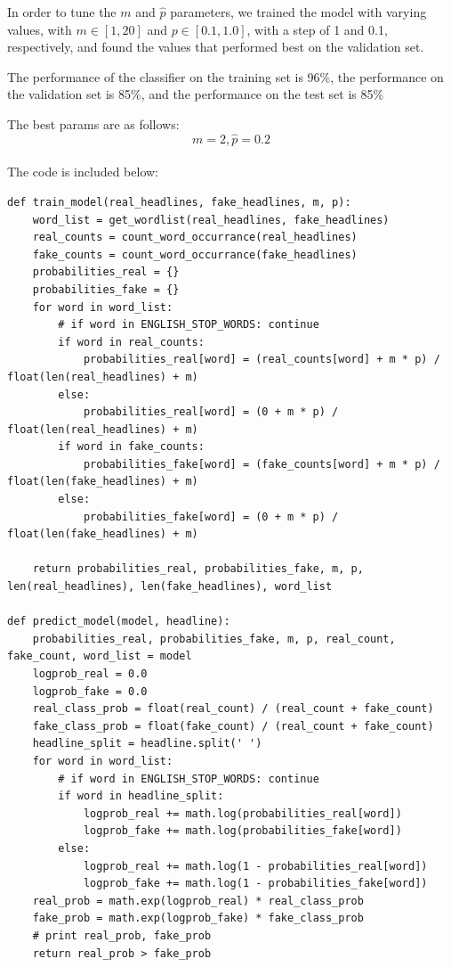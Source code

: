 \documentclass[10pt,letterpaper]{article}
\begin{document}
\begin{enumerate}
		In order to tune the $m$ and $\hat{p}$ parameters, we trained the model with varying values, with $m \in [1, 20]$ and $p\in [0.1, 1.0]$, with a step of 1 and 0.1, respectively, and found the values that performed best on the validation set.

		The performance of the classifier on the training set is 96\%, the performance on the validation set is 85\%, and the performance on the test set is 85\%

		The best params are as follows: \\
		\[m = 2, \hat{p} = 0.2\]
		\\
		The code is included below:
		\begin{lstlisting}
def train_model(real_headlines, fake_headlines, m, p):
    word_list = get_wordlist(real_headlines, fake_headlines)
    real_counts = count_word_occurrance(real_headlines)
    fake_counts = count_word_occurrance(fake_headlines)
    probabilities_real = {}
    probabilities_fake = {}
    for word in word_list:
        # if word in ENGLISH_STOP_WORDS: continue
        if word in real_counts:
            probabilities_real[word] = (real_counts[word] + m * p) / float(len(real_headlines) + m)
        else:
            probabilities_real[word] = (0 + m * p) / float(len(real_headlines) + m)
        if word in fake_counts:
            probabilities_fake[word] = (fake_counts[word] + m * p) / float(len(fake_headlines) + m)
        else:
            probabilities_fake[word] = (0 + m * p) / float(len(fake_headlines) + m)

    return probabilities_real, probabilities_fake, m, p, len(real_headlines), len(fake_headlines), word_list

def predict_model(model, headline):
    probabilities_real, probabilities_fake, m, p, real_count, fake_count, word_list = model
    logprob_real = 0.0
    logprob_fake = 0.0
    real_class_prob = float(real_count) / (real_count + fake_count)
    fake_class_prob = float(fake_count) / (real_count + fake_count)
    headline_split = headline.split(' ')
    for word in word_list:
        # if word in ENGLISH_STOP_WORDS: continue
        if word in headline_split:
            logprob_real += math.log(probabilities_real[word])
            logprob_fake += math.log(probabilities_fake[word])
        else:
            logprob_real += math.log(1 - probabilities_real[word])
            logprob_fake += math.log(1 - probabilities_fake[word])
    real_prob = math.exp(logprob_real) * real_class_prob
    fake_prob = math.exp(logprob_fake) * fake_class_prob
    # print real_prob, fake_prob
    return real_prob > fake_prob


\end{lstlisting}
\end{enumerate}
\end{document}
